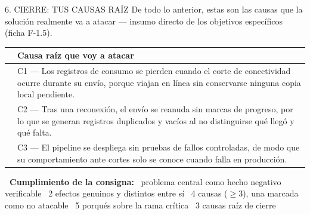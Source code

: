 \documentclass[11pt,a4paper]{article}
\newcommand{\tblhead}{\rowcolor{gris800}}
\begin{document}
\begin{seccion}{\faFlagCheckered}{6. CIERRE: TUS CAUSAS RAÍZ}
{\small De todo lo anterior, estas son las causas que la solución realmente va a atacar --- insumo directo de los objetivos específicos (ficha F-1.5).}
\vspace{4pt}
\renewcommand{\arraystretch}{1.35}
\begin{tabularx}{\linewidth}{>{\centering\arraybackslash}p{0.6cm} X}
  \toprule
  \tblhead {\color{white}\bfseries N.\textordmasculine} & {\color{white}\bfseries Causa raíz que voy a atacar} \\
  \midrule
  1 & C1 --- Los registros de consumo se pierden cuando el corte de conectividad ocurre durante su envío, porque viajan en línea sin conservarse ninguna copia local pendiente. \\
  2 & C2 --- Tras una reconexión, el envío se reanuda sin marcas de progreso, por lo que se generan registros duplicados y vacíos al no distinguirse qué llegó y qué falta. \\
  3 & C3 --- El pipeline se despliega sin pruebas de fallos controladas, de modo que su comportamiento ante cortes solo se conoce cuando falla en producción. \\
  \bottomrule
\end{tabularx}

\vspace{8pt}
\begin{tcolorbox}[enhanced, colback=rojo100, colframe=rojo700, boxrule=0.8pt,
  arc=3pt, left=10pt, right=10pt, top=8pt, bottom=8pt]
  {\small\bfseries\color{rojo900}\faClipboardCheck\ Cumplimiento de la consigna:}\;
  {\small\color{gris900}
  \faCheckSquare~problema central como hecho negativo verificable\quad
  \faCheckSquare~2 efectos genuinos y distintos entre sí\quad
  \faCheckSquare~4 causas ($\geq$3), una marcada como no atacable\quad
  \faCheckSquare~5 porqués sobre la rama crítica\quad
  \faCheckSquare~3 causas raíz de cierre}
\end{tcolorbox}
\end{seccion}
\end{document}
